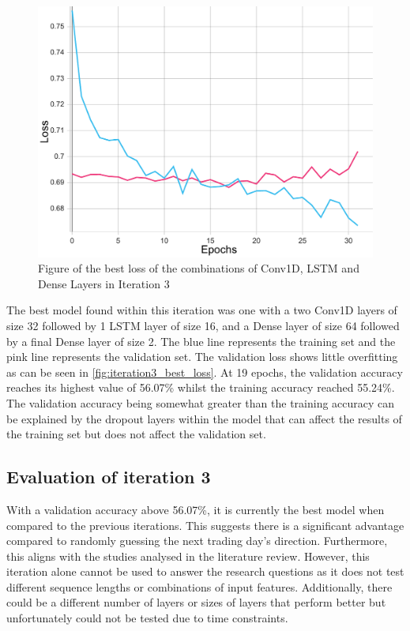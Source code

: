 \begin{figure}[ht]
    \centering
    \includegraphics[width=0.95\columnwidth]{figures/results/cnnlstm/cnnlstm_2C32-1L16-2D64_loss.pdf}
    \caption[Best loss for Iteration 3]{Figure of the best loss of the combinations of Conv1D, LSTM and Dense Layers in Iteration 3}
    \label{fig:iteration3_best_loss}
\end{figure}
\FloatBarrier

The best model found within this iteration was one with a two Conv1D layers of size 32 followed by 1 LSTM layer
of size 16, and a Dense layer of size 64 followed by a final Dense layer of size 2.
The blue line represents the training set and the pink line represents
the validation set. The validation loss shows little overfitting as can be seen in
\autoref{fig:iteration3_best_loss}. At 19 epochs, the validation accuracy reaches its highest value of
56.07\% whilst the training accuracy reached 55.24\%. The validation accuracy being somewhat greater than the
training accuracy can be explained by the dropout layers within the model that can affect the results of the training
set but does not affect the validation set.

\subsection{Evaluation of iteration 3}
With a validation accuracy above 56.07\%, it is currently the best model when compared to the previous iterations.
This suggests there is a significant advantage compared to randomly guessing the next trading day's direction.
Furthermore, this aligns with the studies analysed in the literature review. However, this iteration alone cannot be
used to answer the research questions as it does not test different sequence lengths or combinations of input features.
Additionally, there could be a different number of layers or sizes of layers that perform better but unfortunately could
not be tested due to time constraints.

